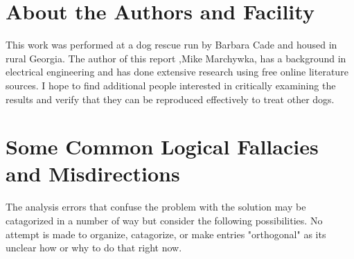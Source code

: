 \begin{mdpicomment}
\section{About the Authors and Facility}
This work was performed at a dog rescue run by Barbara Cade and
housed in rural Georgia.  The author of this report 
,Mike Marchywka,
has a background in electrical engineering and 
has done extensive research using free online literature sources.  
I hope to find additional people interested in critically 
examining the results and verify that they can be reproduced
effectively to treat other dogs.

\begin{comment}
\begin{figure}[htb] 
\centering
\mjmed{ picture commented out to save space in drafts...  } 
\caption{ 
 }
\end{figure}

\end{comment}



\section{Some Common Logical Fallacies and Misdirections}
\label{appendix:errors}

The analysis errors that confuse the problem with the
solution may be catagorized in a number of way but
consider the following possibilities. No attempt is made
to organize, catagorize, or make entries "orthogonal"
as its unclear how or why to do that right now.  


\end{mdpicomment}
